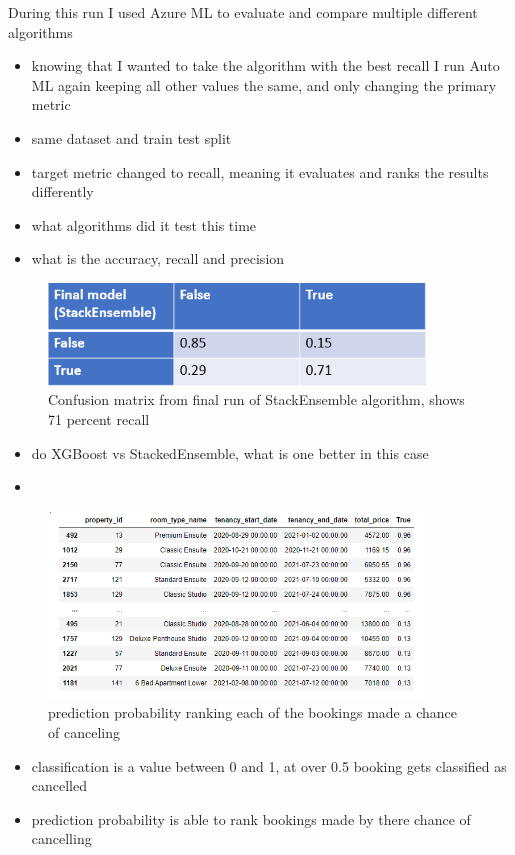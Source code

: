 During this run I used Azure ML to evaluate and compare multiple different algorithms

\begin{itemize}
\item knowing that I wanted to take the algorithm with the best recall I run Auto ML again keeping all other values the same, and only changing the primary metric 
\item same dataset and train test split
\item target metric changed to recall, meaning it evaluates and ranks the results differently 
\item what algorithms did it test this time
\item what is the accuracy, recall and precision
\end{itemize}

\begin{figure}[hbt!]
 \includegraphics[width=10cm]{figures/azure_ml_confusion_matrix.png}
 \caption{Confusion matrix from final run of StackEnsemble algorithm, shows 71 percent recall}
\end{figure}

\begin{itemize}
\item do XGBoost vs StackedEnsemble, what is one better in this case
\item 
\end{itemize}


\begin{figure}[hbt!]
 \includegraphics[width=10cm]{figures/canc_prob.png}
 \caption{prediction probability ranking each of the bookings made a chance of canceling}
\end{figure}

\begin{itemize}
\item classification is a value between 0 and 1, at over 0.5 booking gets classified as cancelled 
\item prediction probability is able to rank bookings made by there chance of cancelling 
\end{itemize}



